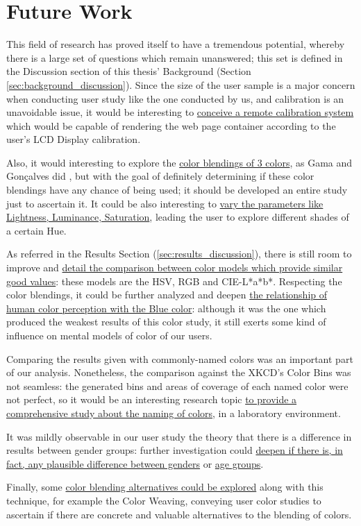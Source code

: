 \section{Future Work}
\label{sec:future_work}
%
This field of research has proved itself to have a tremendous potential, whereby there is a large set of questions which remain unanswered; this set is defined
in the Discussion section of this thesis' Background (Section \ref{sec:background_discussion}). Since the size of the user sample is a major concern when
conducting user study like the one conducted by us, and calibration is an unavoidable issue, it would be interesting to \ul{conceive a remote calibration system}
which would be capable of rendering the web page container according to the user's LCD Display calibration. \par
%
Also, it would interesting to explore the \ul{color blendings of 3 colors}, as Gama and Gonçalves did \cite{Gama20141}, but with the goal of definitely
determining if these color blendings have any chance of being used; it should be developed an entire study just to ascertain it. It could be also interesting
to \ul{vary the parameters like Lightness, Luminance, Saturation}, leading the user to explore different shades of a certain Hue. \par
%
As referred in the Results Section (\ref{sec:results_discussion}), there is still room to improve and \ul{detail the comparison between color models which provide
similar good values}: these models are the HSV, RGB and CIE-L*a*b*. Respecting the color blendings, it could be further analyzed and deepen \ul{the relationship of human
color perception with the Blue color}: although it was the one which produced the weakest results of this color study, it still exerts some kind of influence on
mental models of color of our users. \par
%
Comparing the results given with commonly-named colors was an important part of our analysis. Nonetheless, the comparison against the XKCD's Color Bins was not seamless:
the generated bins and areas of coverage of each named color were not perfect, so it would be an interesting research topic \ul{to provide a comprehensive study about
the naming of colors}, in a laboratory environment. \par
%
It was mildly observable in our user study the theory that there is a difference in results between gender groups: further investigation could \ul{deepen if there is, in
fact, any plausible difference between genders} or \ul{age groups}. \par
%
Finally, some \ul{color blending alternatives could be explored} along with this technique, for example the Color Weaving, conveying user color studies to ascertain if
there are concrete and valuable alternatives to the blending of colors.
%
